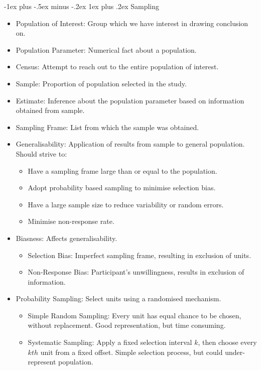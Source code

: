 \documentclass[10pt, landscape]{article}
\makeatletter
\renewcommand{\subsection}{\@startsection{subsection}{3}{0mm}%
                                {-1ex plus -.5ex minus -.2ex}%
                                {1ex plus .2ex}%
                                {\normalfont\small\bfseries}}%
\makeatother
\begin{document}
\begin{multicols*}{3}
\subsection{Sampling}
\begin{itemize}
    \item Population of Interest: Group which we have interest in drawing conclusion on.
    \item Population Parameter: Numerical fact about a population.
    \item Census: Attempt to reach out to the entire population of interest.
    \item Sample: Proportion of population selected in the study.
    \item Estimate: Inference about the population parameter based on information obtained from sample.
    \item Sampling Frame: List from which the sample was obtained.
    \item Generalisability: Application of results from sample to general population. Should strive to:
    \begin{itemize}
        \item Have a sampling frame large than or equal to the population.
        \item Adopt probability based sampling to minimise selection bias.
        \item Have a large sample size to reduce variability or random errors.
        \item Minimise non-response rate.
    \end{itemize}
    \item Biasness: Affects generalisability.
    \begin{itemize}
        \item Selection Bias: Imperfect sampling frame, resulting in exclusion of units.
        \item Non-Response Bias: Participant's unwillingness, results in exclusion of information.
    \end{itemize}
    \item Probability Sampling: Select units using a randomised mechanism.
    \begin{itemize}
        \item Simple Random Sampling: Every unit has equal chance to be chosen, without replacement. Good representation, but time consuming.
        \item Systematic Sampling: Apply a fixed selection interval $k$, then choose every $kth$ unit from a fixed offset. Simple selection process, but could under-represent population.

\end{itemize}
\end{itemize}
\end{multicols*}
\end{document}
